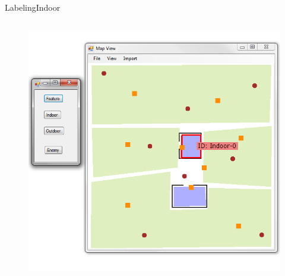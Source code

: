 \begin{frame}{Labeling}{Indoor}

\begin{columns}
\begin{figure}
\centering
\includegraphics[width = \textwidth]{./screenshot/indoor_label.png}
\end{figure}

\begin{minipage}{\textwidth}
\end{minipage}
\end{columns}

\end{frame}

